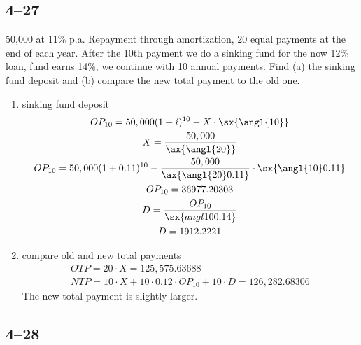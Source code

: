 \documentclass[a4paper, 12pt, reqno]{amsart}
\numberwithin{equation}{section}
\begin{document}
\subsection*{4--27}

50,000 at 11\% p.a. Repayment through amortization, 20 equal payments at the
end of each year. After the 10th payment we do a sinking fund for the now 12\%
loan, fund earns 14\%, we continue with 10 annual payments. Find (a) the
sinking fund deposit and (b) compare the new total payment to the old one.
\begin{enumerate}[label=(alph*)]
    \item sinking fund deposit
        \begin{equation}\nonumber
            \begin{gathered}
                OP_{10} = 50,000(1+i)^{10} - X \cdot \sx{\angl{10}} \\
                X = \frac{50,000}{\ax{\angl{20}}}        \\
                OP_{10} = 50,000(1+0.11)^{10} - \frac{50,000}{\ax{\angl{20}0.11}}
                    \cdot \sx{\angl{10}0.11}            \\
                OP_{10} = 36977.20303                   \\
                D = \frac{OP_{10}}{\sx{angl{10}0.14}}    \\
                D = 1912.2221
            \end{gathered}
        \end{equation}
    \item compare old and new total payments
        \begin{equation}\nonumber
            \begin{gathered}
                OTP = 20 \cdot X = 125,575.63688     \\
                NTP = 10 \cdot X + 10 \cdot 0.12 \cdot OP_{10} + 10 \cdot D 
                    = 126,282.68306
            \end{gathered}
        \end{equation}
    The new total payment is slightly larger.
\end{enumerate}

\subsection*{4--28}
\end{document}
